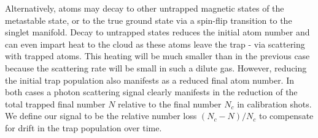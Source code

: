 Alternatively, atoms may decay to other untrapped magnetic states of the metastable state, or to the true ground state via a spin-flip transition to the singlet manifold.
	Decay to untrapped states reduces the initial atom number and can even impart heat to the cloud as these atoms leave the trap - via scattering with trapped atoms.
	This heating will be much smaller than in the previous case because the scattering rate will be small in such a dilute gas.
	However, reducing the initial trap population also manifests as a reduced final atom number.
	In both cases a photon scattering signal clearly manifests in the reduction of the total trapped final number $N$ relative to the final number $N_c$ in calibration shots.
	We define our signal to be the relative number loss $(N_c-N)/N_c$ to compensate for drift in the trap population over time.

